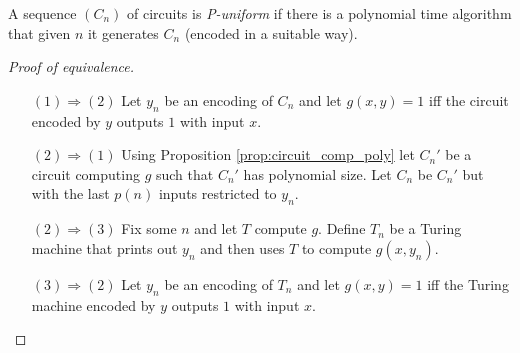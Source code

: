 \documentclass{report}
\theoremstyle{definition}
\theoremstyle{plain}
\theoremstyle{definition}
\begin{document}
	A sequence $(C_n)$ of circuits is \emph{P-uniform} if there is a polynomial time algorithm that given $n$ it generates $C_n$ (encoded in a suitable way).
	\begin{proof}[Proof of equivalence]\leavevmode
		\begin{itemize}
			\item[$(1)\Rightarrow (2)$] Let $y_n$ be an encoding of $C_n$ and let $g(x,y) = 1$ iff the circuit encoded by $y$ outputs $1$ with input $x$. 
			\item [$(2)\Rightarrow (1)$]
			Using Proposition \ref{prop:circuit_comp_poly} let $C_n'$ be a circuit computing $g$ such that $C_n'$ has polynomial size. Let $C_n$ be $C_n'$ but with the last $p(n)$ inputs restricted to $y_n$.
			\item [$(2)\Rightarrow (3)$]
			Fix some $n$ and let $T$ compute $g$. Define $T_n$ be a Turing machine that prints out $y_n$ and then uses $T$ to compute $g(x,y_n)$.
			\item [$(3)\Rightarrow (2)$]
			Let $y_n$ be an encoding of $T_n$ and let $g(x,y) = 1$ iff the Turing machine encoded by $y$ outputs $1$ with input $x$.
		\end{itemize}
	\end{proof}
\end{document}

